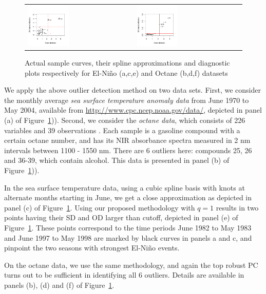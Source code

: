 \begin{figure}
\begin{center}
\begin{tabular}{ll}
\includegraphics[width=0.4\textwidth]{./Plots/Elnino_functional3} &
\includegraphics[width=0.4\textwidth]{./Plots/Octane_functional3}\\
\end{tabular}
\caption{Actual sample curves, their spline approximations and diagnostic plots respectively for El-Ni\~no (a,c,e) and Octane (b,d,f) datasets}
\label{fig:fPCAfig}
\end{center}
\end{figure}

We apply the above outlier detection method on two data sets. First, we consider the 
monthly average \textit{sea surface temperature anomaly data} 
from June 1970 to May 2004, available 
from \url{http://www.cpc.ncep.noaa.gov/data/}, depicted in  panel (a) 
of Figure~\ref{fig:fPCAfig})).
Second, we consider the \textit{octane data}, which consists of 226 variables and 39 
observations \citep{ref:EsbensenetalBook94}. 
Each sample is a gasoline compound with a certain octane 
number, and has its NIR absorbance spectra measured in 2 nm intervals between 1100 - 1550 
nm. There are 6 outliers here: compounds 25, 26 and 36-39, which contain alcohol. This 
data is presented in  panel (b) of Figure~\ref{fig:fPCAfig})).

In the sea surface temperature data, using a cubic spline basis with knots at alternate 
months starting in June, we get a close approximation as depicted in 
panel (c) of Figure~\ref{fig:fPCAfig}. Using our proposed methodology with $q =1$ 
results in two points having their SD and OD larger than cutoff, depicted in  
panel (e) of Figure~\ref{fig:fPCAfig}. These points correspond to the time periods June 
1982 to May 1983 and June 1997 to May 1998 are marked by black curves in panels a and c, 
and pinpoint the two seasons with strongest El-Ni\~no events. 


On the octane data, we use the same methodology, 
 and again the top robust PC turns out to be sufficient in identifying all 6 outliers. 
 Details are available in  panels (b), (d) and (f) of Figure~\ref{fig:fPCAfig}.